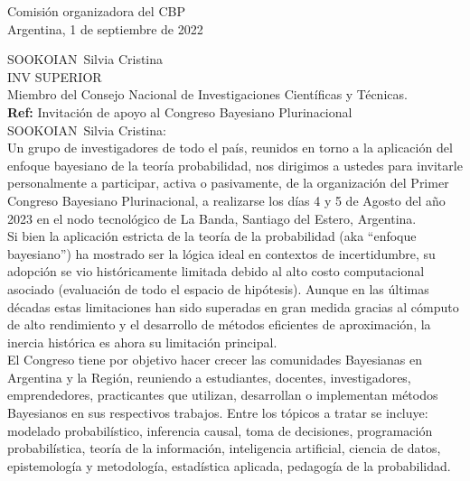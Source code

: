 \documentclass[a4paper,11pt]{article}
\begin{document}
\begin{flushright}
Comisión organizadora del CBP \\
Argentina, 1 de septiembre de 2022
\end{flushright} 

\vspace{0.1cm}
\noindent
SOOKOIAN Silvia Cristina\\
INV SUPERIOR \\
Miembro del Consejo Nacional de Investigaciones Científicas y Técnicas.\\[-0.1cm]

\hfill \textbf{Ref:} Invitación de apoyo al Congreso Bayesiano Plurinacional \\

\vspace{0.3cm} \noindent SOOKOIAN Silvia Cristina:\\

\indent Un grupo de investigadores de todo el país, reunidos en torno a la aplicación del enfoque bayesiano de la teoría probabilidad, nos dirigimos a ustedes para invitarle personalmente a participar, activa o pasivamente, de la organización del Primer Congreso Bayesiano Plurinacional, a realizarse los días 4 y 5 de Agosto del año 2023 en el nodo tecnológico de La Banda, Santiago del Estero, Argentina. \\

\indent Si bien la aplicación estricta de la teoría de la probabilidad (aka ``enfoque bayesiano'') ha mostrado ser la lógica ideal en contextos de incertidumbre, su adopción se vio históricamente limitada debido al alto costo computacional asociado (evaluación de todo el espacio de hipótesis). Aunque en las últimas décadas estas limitaciones han sido superadas en gran medida gracias al cómputo de alto rendimiento y el desarrollo de métodos eficientes de aproximación, la inercia histórica es ahora su limitación principal. \\

\indent  El Congreso tiene por objetivo hacer crecer las comunidades Bayesianas en Argentina y la Región, reuniendo a estudiantes, docentes, investigadores, emprendedores, practicantes que utilizan, desarrollan o implementan métodos Bayesianos en sus respectivos trabajos. Entre los tópicos a tratar se incluye: modelado probabilístico, inferencia causal, toma de decisiones, programación probabilística, teoría de la información, inteligencia artificial, ciencia de datos, epistemología y metodología, estadística aplicada, pedagogía de la probabilidad. \\
\end{document}

